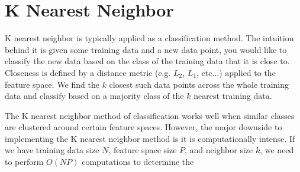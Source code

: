 \chapter{K Nearest Neighbor}

\vspace{5 mm}
\noindent
K nearest neighbor is typically applied as a classification method. The 
intuition behind it is given some training data and a new data point, you would 
like to classify the new data based on the class of the training data that it 
is close to. Closeness is defined by a distance metric (e.g. $L_{2}$, $L_{1}$, 
etc...) applied to the feature space. We find the $k$ closest such data points 
across the whole training data and classify based on a majority class of the 
$k$ nearest training data.

\vspace{5 mm}
\noindent
The K nearest neighbor method of classification works well when similar classes 
are clustered around certain feature spaces. However, the major downside to 
implementing the K nearest neighbor method is it is computationally intense. 
If we have training data size $N$, feature space size $P$, and neighbor size 
$k$, we need to perform $O(NP)$ computations to determine the 